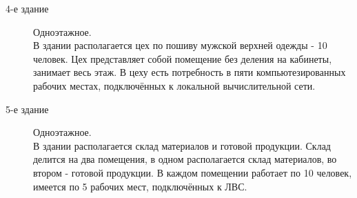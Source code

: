 \begin{description}
\item [4-е здание]
  Одноэтажное.\\
  В здании располагается цех по пошиву мужской верхней одежды - 10 человек.
  Цех представляет собой помещение без деления на кабинеты, занимает весь этаж. В цеху есть потребность в пяти компьютезированных рабочих местах, подключённых к локальной вычислительной сети.
\item [5-е здание]
  Одноэтажное.\\
  В здании располагается склад материалов и готовой продукции. Склад делится на два помещения, в одном располагается склад материалов, во втором - готовой продукции. В каждом помещении работает по 10 человек, имеется по 5 рабочих мест, подключённых к ЛВС.
\end{description}